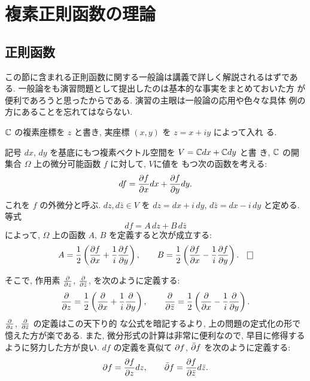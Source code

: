 \documentclass[12pt,twoside]{jarticle}
\begin{document}

\section{複素正則函数の理論}


\subsection{正則函数}

この節に含まれる正則函数に関する一般論は講義で詳しく解説されるはずであ
る. 一般論をも演習問題として提出したのは基本的な事実をまとめておいた方
が便利であろうと思ったからである. 演習の主眼は一般論の応用や色々な具体
例の方にあることを忘れてはならない. 

${\mathbb C}$ の複素座標を $z$ と書き, 実座標 $(x,y)$ を $z=x+iy$ によって入れ
る.

\begin{question}
  記号 $dx$, $dy$ を基底にもつ複素ベクトル空間を $V={\mathbb C} dx+{\mathbb C} dy$ と書
  き, ${\mathbb C}$ の開集合 $\Omega$ 上の微分可能函数 $f$ に対して, $V$に値を
  もつ次の函数を考える:
  \[
    df = \frac{\partial f}{\partial x}dx + \frac{\partial f}{\partial y}dy.
  \]%
  これを $f$ の外微分と呼ぶ. $dz,d\bar{z}\in V$ を $dz=dx+i\,dy$,
  $d\bar{z}=dx-i\,dy$ と定める. 等式
  \[
    df = A\,dz + B\,d\bar{z}
  \]%
  によって, $\Omega$ 上の函数 $A$, $B$ を定義すると次が成立する:
  \[
    A =
    \frac{1}{2}
    \left(
      \frac{\del f}{\del x} + \frac{1}{i} \frac{\del f}{\del y}
    \right),
    \qquad
    B =
    \frac{1}{2}
    \left(
      \frac{\del f}{\del x} - \frac{1}{i} \frac{\del f}{\del y}
    \right). 
    \qed
  \]%
\end{question}

\noindent そこで, 作用素 $\frac{\partial}{\partial z}$,
$\frac{\partial}{\partial\bar{z}}$, を次のように定義する:
\[
  \frac{\partial}{\partial z} =
  \frac{1}{2}
  \left( \frac{\partial}{\partial x} + \frac{1}{i} \frac{\partial}{\partial y} \right),
  \qquad
  \frac{\partial}{\partial\bar z} =
  \frac{1}{2}
  \left( \frac{\partial}{\partial x} - \frac{1}{i} \frac{\partial}{\partial y} \right).
\]%
$\frac{\partial}{\partial z}$, $\frac{\partial}{\partial\bar{z}}$ の定義はこの天下り的
な公式を暗記するより, 上の問題の定式化の形で憶えた方が楽である. また, 
微分形式の計算は非常に便利なので, 早目に修得するように努力した方が良い. 
$df$ の定義を真似て $\partial f$, ${\bar\partial} f$ を次のように定義する:
\[
  \partial f = \frac{\partial f}{\partial z}dz,
  \qquad
  {\bar\partial} f = \frac{\partial f}{\partial\bar z}d\bar{z}.
\]%
\end{document}
